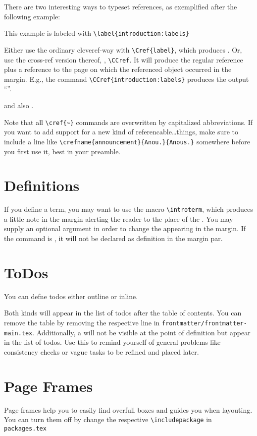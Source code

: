 There are two interesting ways to typeset references, as exemplified after the following example:
\begin{example}\label{introduction:labels}
	This example is labeled with \lstinline|\label{introduction:labels}|
\end{example}

Either use the ordinary cleveref-way with \lstinline|\Cref{label}|, which produces .
Or, use the cross-ref version thereof, \ie, \lstinline!\CCref!. 
It will produce the regular reference plus a reference to the page on which the referenced object occurred in the margin.
E.g., the command \lstinline!\CCref{introduction:labels}! produces the output ``''.

 and also .

Note that all \lstinline|\cref{~}| commands are overwritten by capitalized abbreviations. 
If you want to add support for a new kind of referencable\dots things, make sure to include a line like \lstinline!\crefname{announcement}{Anou.}{Anous.}! somewhere before you first use it, best in your preamble.

\section{Definitions}\label{introduction:definitions}

If you define a term, you may want to use the macro \lstinline{\introterm}, which produces a little note in the margin alerting the reader to the place of the .
You may supply an optional argument in order to change the  appearing in the margin. If the command is , it will not be declared as definition in the margin par.

\section{ToDos}\label{introduction:todos}
You can defne todos either outline or inline. 

Both kinds will appear in the list of todos after the table of contents. You can remove the table by removing the respective line in \lstinline{frontmatter/frontmatter-main.tex}.
Additionally, a  will not be visible at the point of definition but appear in the list of todos. Use this to remind yourself of general problems like consistency checks or vague tasks to be refined and placed later. 

\section{Page Frames}\label{introduction:pageframes}

Page frames help you to easily find overfull boxes and guides you when layouting. You can turn them off by change the respective \lstinline{\includepackage} in \lstinline{packages.tex}

